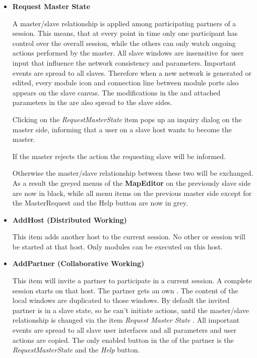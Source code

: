 	 \begin{itemize}
    
	 \item{\bf Request Master State}
       
	 A master/slave relationship is applied among participating partners of a 
	 session. This means, that at every point in time only one participant has 
	 control over the overall session, while the others can only watch ongoing 
	 actions performed by the master. All slave windows are insensitive for user 
	 input that influence the network consistency and parameters. Important events are spread 
    to all slaves. Therefore when a new 
	 network is generated or edited, every module icon and connection line between 
	 module ports also appears on the slave {\mapeditor} canvas. The modifications 
	 in the {\myparameter} and attached parameters in the {\mycontrol} are also 
	 spread to the slave sides. 
    
	 Clicking on the {\it RequestMasterState} item pops up an inquiry dialog on the master side, 
	 informing that a user on a slave host wants to become the master.


	 If the master rejects the action the requesting slave will be informed. 


	 Otherwise the 
	 master/slave relationship between these two will be exchanged. As a result 
	 the greyed menus of the {\bf MapEditor} on the previously slave side are now in 
	 black, while all menu items on the previous master side except for the MasterRequest and the Help button
	  are now in grey. 

	 \item {\bf AddHost (Distributed Working)} 

	 This item adds another host to the current session.  No other {\mapeditor} or {\covise} session 
    will be started at that host. Only modules can be executed on this host.

	 \item {\bf AddPartner (Collaborative Working)} 

	 This item will invite a partner to participate in a current session. A  complete {\covise} session starts 
    on that host. The partner gets an own {\mapeditor}. The content of the local windows 
	 are duplicated to those windows. By default the invited partner is in a slave state, so he
	 can't initiate actions, until the master/slave relationship is changed via the item {\it Request Master State }.
	 All important events are spread to all slave user interfaces and 
	 all parameters and user actions are copied. The only enabled button in the {\mymenubar} of the partner 
	 is the {\it RequestMasterState} and the {\it Help} button.
    

\end{itemize}
